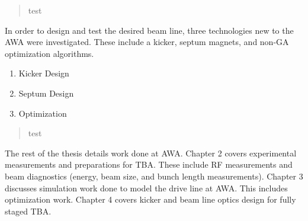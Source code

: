 \begin{quotation}
        test
\end{quotation}



In order to design and test the desired beam line, three technologies 
new to the AWA were investigated. These include a kicker, septum magnets, 
and non-GA optimization algorithms.

\begin{enumerate}
	\item Kicker Design
	\item Septum Design
	\item Optimization 
\end{enumerate}

\begin{quotation}
	test
\end{quotation}




The rest of the thesis details work done at AWA.
Chapter 2 covers experimental measurements and preparations for TBA.
These include RF measurements and beam diagnostics (energy, beam size, and bunch length measurements).
Chapter 3 discusses simulation work done to model the drive line at AWA.
This includes optimization work.
Chapter 4 covers kicker and beam line optics design for fully staged TBA.

